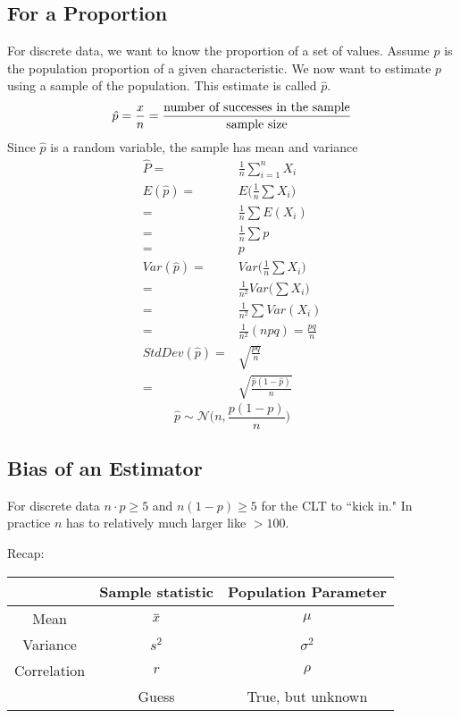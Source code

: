 \documentclass[11pt, oneside]{article}   	%
\newcommand{\overbar}[1]{\mkern 1.5mu\overline{\mkern-1.5mu#1\mkern-1.5mu}\mkern 1.5mu}
\begin{document}
\subsection{For a Proportion}

For discrete data, we want to know the proportion of a set of values. Assume $p$ is the population proportion of a given characteristic. We now want to estimate $p$ using a sample of the population. This estimate is called $\hat{p}$.
\[
\hat{p} = \frac{x}{n} = \frac{\text{number of successes in the sample}}{\text{sample size}}\\
\]
Since $\hat{p}$ is a random variable, the sample has mean and variance
\begin{align*}
\hat{P} =& \frac{1}{n}\sum \limits_{i=1}^{n} X_i\\
E(\hat{p}) =& E\bigg(\frac{1}{n}\sum X_i \bigg) \\
 =& \frac{1}{n}\sum E(X_i)\\
 =& \frac{1}{n}\sum p\\
 =&p \\
 Var(\hat{p}) =& Var\bigg(\frac{1}{n}\sum X_i \bigg)\\
   =& \frac{1}{n^2} Var\bigg( \sum X_i \bigg) \\
   =& \frac{1}{n^2}\sum Var(X_i) \\
   =& \frac{1}{n^2} (npq) = \frac{pq}{n}\\
 StdDev(\hat{p}) =& \sqrt{\frac{pq}{n}} \\
  =& \sqrt{\frac{\hat{p}(1-\hat{p})}{n}}  
\end{align*}
\[
\hat{p} \sim \mathcal{N} \bigg(n, \frac{p(1-p)}{n}\bigg)
\]

\subsection{Bias of an Estimator}

For discrete data $n\cdot p \geq 5$ and $n(1-p) \geq 5$ for the CLT to ``kick in." In practice $n$ has to relatively much larger like $> 100$.

Recap:
\begin{tabular}{| c | c | c| }
\hline
 & Sample statistic &  Population Parameter \\
 \hline
 Mean & $\overbar{x}$ & $\mu$ \\
 Variance & $s^2$ & $\sigma^2$ \\
 Correlation & $r$ & $\rho$ \\
\hline
& Guess & True, but unknown \\
\hline
\end{tabular}
\end{document}
